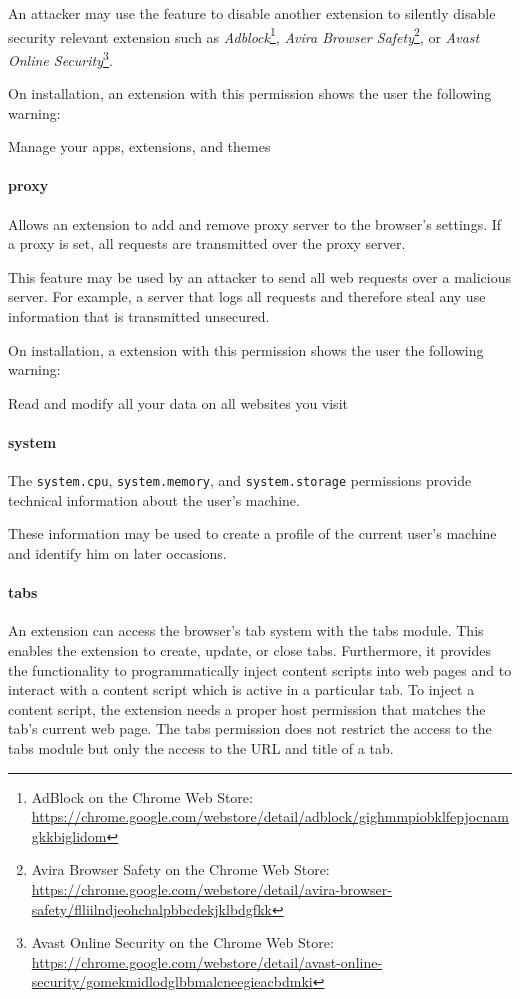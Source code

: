 	An attacker may use the feature to disable another extension to silently disable security relevant extension such as 
	\textit{Adblock}\footnote{AdBlock on the Chrome Web Store: \url{https://chrome.google.com/webstore/detail/adblock/gighmmpiobklfepjocnamgkkbiglidom}}, 
	\textit{Avira Browser Safety}\footnote{Avira Browser Safety on the Chrome Web Store: \url{https://chrome.google.com/webstore/detail/avira-browser-safety/flliilndjeohchalpbbcdekjklbdgfkk}}, or 
	\textit{Avast Online Security}\footnote{Avast Online Security on the Chrome Web Store: \url{https://chrome.google.com/webstore/detail/avast-online-security/gomekmidlodglbbmalcneegieacbdmki}}.

	On installation, an extension with this permission shows the user the following warning:
	\begin{permissionwarning}
		Manage your apps, extensions, and themes 
	\end{permissionwarning}
	
\paragraph{proxy}
	Allows an extension to add and remove proxy server to the browser's settings. If a proxy is set, all requests are transmitted over the proxy server.

	This feature may be used by an attacker to send all web requests over a malicious server. For example, a server that logs all requests and therefore steal any use information that is transmitted unsecured.

	On installation, a extension with this permission shows the user the following warning:
	\begin{permissionwarning}
		Read and modify all your data on all websites you visit 
	\end{permissionwarning}
	
\paragraph{system}
	The \texttt{system.cpu}, \texttt{system.memory}, and \texttt{system.storage} permissions provide technical information about the user's machine.
	
	These information may be used to create a profile of the current user's machine and identify him on later occasions.

\paragraph{tabs}
	An extension can access the browser's tab system with the tabs module. This enables the extension to create, update, or close tabs. Furthermore, it provides the functionality to programmatically inject content scripts into web pages and to interact with a content script which is active in a particular tab. To inject a content script, the extension needs a proper host permission that matches the tab's current web page. The tabs permission does not restrict the access to the tabs module but only the access to the URL and title of a tab. 
	
